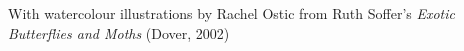 With watercolour illustrations by Rachel Ostic from Ruth Soffer's \textit{Exotic Butterflies and Moths} (Dover, 2002)